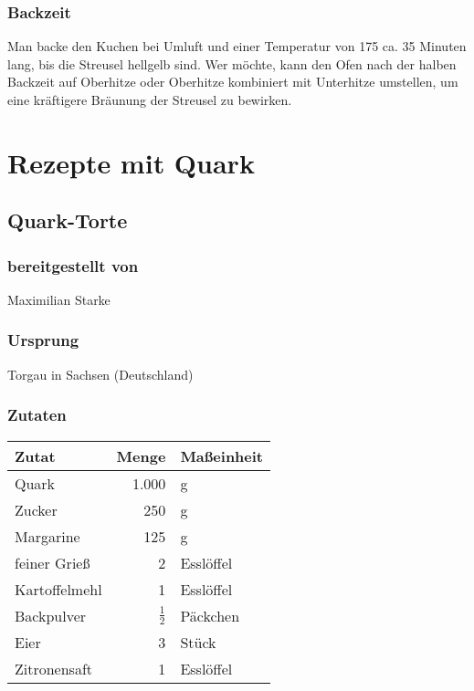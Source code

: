 \documentclass[a4paper]{book}
\begin{document}
\subsubsection{Backzeit}
	Man backe den Kuchen bei Umluft und einer Temperatur von 175{\textcelsius} ca. 35 Minuten lang, bis die Streusel hellgelb sind. Wer möchte, kann den Ofen nach der halben Backzeit auf Oberhitze oder Oberhitze kombiniert mit Unterhitze umstellen, um eine kräftigere Bräunung der Streusel zu bewirken.


\section{Rezepte mit Quark}

\newpage
\subsection{Quark-Torte}

\subsubsection{bereitgestellt von}
	Maximilian Starke
\subsubsection{Ursprung}
	Torgau in Sachsen (Deutschland)
\subsubsection{Zutaten}
\begin{center}
	\begin{tabular}{|l|rl|}
		\hline
		\textbf{Zutat} & \textbf{Menge} & \textbf{Maßeinheit} \\
		\hline
		Quark & 1.000 & g \\
		Zucker & 250 & g \\
		\hline
		Margarine & 125 & g \\
		feiner Grieß & 2 & Esslöffel \\
		\hline
		Kartoffelmehl & 1 & Esslöffel \\
		Backpulver & $\frac{1}{2}$ & Päckchen \\
		\hline
		Eier & 3 & Stück \\
		Zitronensaft & 1 & Esslöffel \\
		\hline
	\end{tabular}
\end{center}
\end{document}
